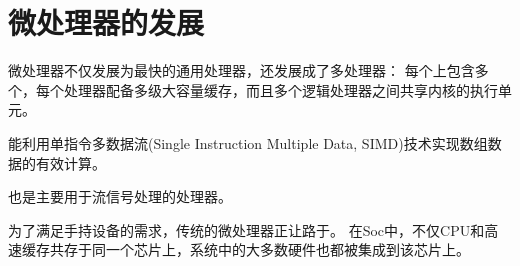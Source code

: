 
\section{微处理器的发展}
{
    微处理器不仅发展为最快的通用处理器，还发展成了多处理器：
    每个上包含多个，每个处理器配备多级大容量缓存，而且多个逻辑处理器之间共享内核的执行单元。

    能利用单指令多数据流(Single Instruction Multiple Data, SIMD)技术实现数组数据的有效计算。

    也是主要用于流信号处理的处理器。

    为了满足手持设备的需求，传统的微处理器正让路于。
    在Soc中，不仅CPU和高速缓存共存于同一个芯片上，系统中的大多数硬件也都被集成到该芯片上。
}
